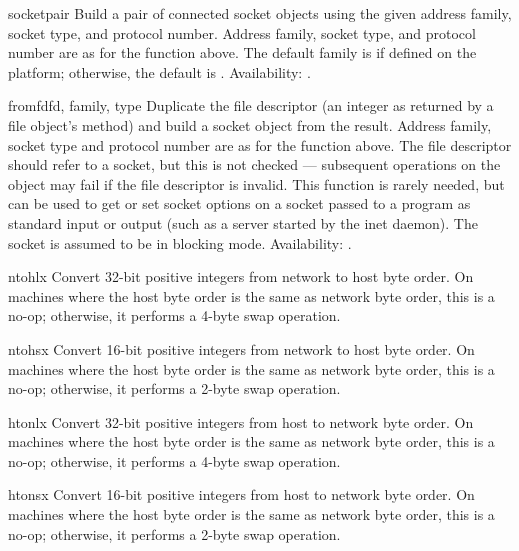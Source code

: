 \begin{funcdesc}{socketpair}{}
Build a pair of connected socket objects using the given address
family, socket type, and protocol number.  Address family, socket type,
and protocol number are as for the  function above.
The default family is  if defined on the platform;
otherwise, the default is .
Availability: \UNIX.  
\end{funcdesc}

\begin{funcdesc}{fromfd}{fd, family, type}
Duplicate the file descriptor  (an integer as returned by a file
object's  method) and build a socket object from the
result.  Address family, socket type and protocol number are as for the
 function above.
The file descriptor should refer to a socket, but this is not
checked --- subsequent operations on the object may fail if the file
descriptor is invalid.  This function is rarely needed, but can be
used to get or set socket options on a socket passed to a program as
standard input or output (such as a server started by the \UNIX{} inet
daemon).  The socket is assumed to be in blocking mode.
Availability: \UNIX.
\end{funcdesc}

\begin{funcdesc}{ntohl}{x}
Convert 32-bit positive integers from network to host byte order.  On machines
where the host byte order is the same as network byte order, this is a
no-op; otherwise, it performs a 4-byte swap operation.
\end{funcdesc}

\begin{funcdesc}{ntohs}{x}
Convert 16-bit positive integers from network to host byte order.  On machines
where the host byte order is the same as network byte order, this is a
no-op; otherwise, it performs a 2-byte swap operation.
\end{funcdesc}

\begin{funcdesc}{htonl}{x}
Convert 32-bit positive integers from host to network byte order.  On machines
where the host byte order is the same as network byte order, this is a
no-op; otherwise, it performs a 4-byte swap operation.
\end{funcdesc}

\begin{funcdesc}{htons}{x}
Convert 16-bit positive integers from host to network byte order.  On machines
where the host byte order is the same as network byte order, this is a
no-op; otherwise, it performs a 2-byte swap operation.
\end{funcdesc}

